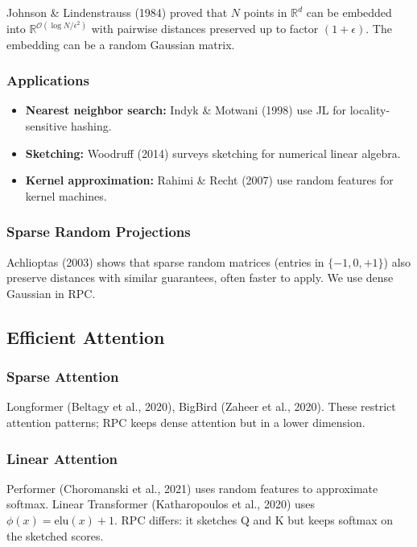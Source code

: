 Johnson \& Lindenstrauss (1984) proved that $N$ points in $\mathbb{R}^d$ can 
be embedded into $\mathbb{R}^{\mathcal{O}(\log N / \epsilon^2)}$ with 
pairwise distances preserved up to factor $(1 + \epsilon)$. The embedding 
can be a random Gaussian matrix.

\subsubsection{Applications}

\begin{itemize}
\item \textbf{Nearest neighbor search:} Indyk \& Motwani (1998) use JL for
  locality-sensitive hashing.
\item \textbf{Sketching:} Woodruff (2014) surveys sketching for numerical linear
  algebra.
\item \textbf{Kernel approximation:} Rahimi \& Recht (2007) use random features
  for kernel machines.

\end{itemize}
\subsubsection{Sparse Random Projections}

Achlioptas (2003) shows that sparse random matrices (entries in 
$\{-1, 0, +1\}$) also preserve distances with similar guarantees, 
often faster to apply. We use dense Gaussian in RPC.

\subsection{Efficient Attention}

\subsubsection{Sparse Attention}

Longformer (Beltagy et al., 2020), BigBird (Zaheer et al., 2020). These 
restrict attention patterns; RPC keeps dense attention but in a lower 
dimension.

\subsubsection{Linear Attention}

Performer (Choromanski et al., 2021) uses random features to approximate 
softmax. Linear Transformer (Katharopoulos et al., 2020) uses $\phi(x) = \text{elu}(x) + 1$. 
RPC differs: it sketches Q and K but keeps softmax on the sketched scores.

